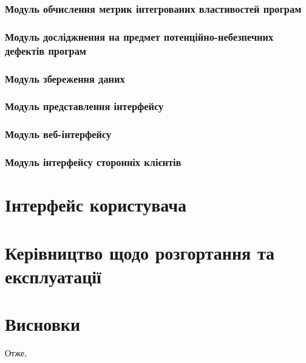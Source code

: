 \subsubsection{Модуль обчислення метрик інтегрованих властивостей програм}
\label{module_metrix_calculations}

\subsubsection{Модуль досліджнення на предмет потенційно-небезпечних дефектів програм}
\label{module_vulnurabilities_search}

\subsubsection{Модуль збереження даних}
\label{module_data_storing}

\subsubsection{Модуль представлення інтерфейсу}
\label{module_interface}

\subsubsection{Модуль веб-інтерфейсу}
\label{module_web_interface}

\subsubsection{Модуль інтерфейсу сторонніх клієнтів}
\label{module_endpoints}

\section{Інтерфейс користувача}
\label{3section:id3}

\section{Керівництво щодо розгортання та експлуатації}
\label{3section:id4}

\section*{Висновки}
Отже,
